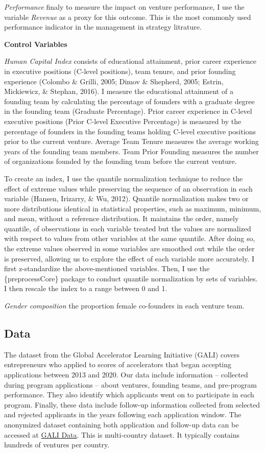 \documentclass[
  english,
  man]{apa6}
\begin{document}
\emph{Performance} finaly to measure the impact on venture performance, I use the variable \emph{Revenue} as a proxy for this outcome. This is the most commonly used performance indicator in the management in strategy litrature.

\textbf{Control Variables}

\emph{Human Capital Index} consists of educational attainment, prior career experience in executive positions (C-level positions), team tenure, and prior founding experience (Colombo \& Grilli, 2005; Dimov \& Shepherd, 2005; Estrin, Mickiewicz, \& Stephan, 2016). I measure the educational attainment of a founding team by calculating the percentage of founders with a graduate degree in the founding team (Graduate Percentage). Prior career experience in C-level executive positions (Prior C-level Executive Percentage) is measured by the percentage of founders in the founding teams holding C-level executive positions prior to the current venture. Average Team Tenure measures the average working years of the founding team members. Team Prior Founding measures the number of organizations founded by the founding team before the current venture.

To create an index, I use the quantile normalization technique to reduce the effect of extreme values while preserving the sequence of an observation in each variable (Hansen, Irizarry, \& Wu, 2012). Quantile normalization makes two or more distributions identical in statistical properties, such as maximum, minimum, and mean, without a reference distribution. It maintains the order, namely quantile, of observations in each variable treated but the values are normalized with respect to values from other variables at the same quantile. After doing so, the extreme values observed in some variables are smoothed out while the order is preserved, allowing us to explore the effect of each variable more accurately. I first z-standardize the above-mentioned variables. Then, I use the \{preprocessCore\} package to conduct quantile normalization by sets of variables. I then rescale the index to a range between 0 and 1.

\emph{Gender composition} the proportion female co-founders in each venture team.

\hypertarget{data}{%
\subsection{Data}\label{data}}

The dataset from the Global Accelerator Learning Initiative (GALI) covers entrepreneurs who applied to scores of accelerators that began accepting applications between 2013 and 2020. Our data include information -- collected during program applications -- about ventures, founding teams, and pre-program performance. They also identify which applicants went on to participate in each program. Finally, these data include follow-up information collected from selected and rejected applicants in the years following each application window. The anonymized dataset containing both application and follow-up data can be accessed at \href{www.galidata.org/data-request}{GALI Data}. This is multi-country dataset. It typically contains hundreds of ventures per country.
\end{document}

